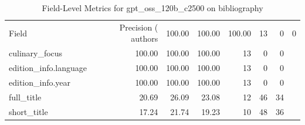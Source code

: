 \begin{table}
\caption{Field-Level Metrics for gpt_oss_120b_c2500 on bibliography}
\label{tab:fields_gpt_oss_120b_c2500_bibliography}
\begin{tabular}{lrrrrrr}
\toprule
Field & Precision (%
\midrule
authors & 100.00 & 100.00 & 100.00 & 13 & 0 & 0 \\
culinary_focus & 100.00 & 100.00 & 100.00 & 13 & 0 & 0 \\
edition_info.language & 100.00 & 100.00 & 100.00 & 13 & 0 & 0 \\
edition_info.year & 100.00 & 100.00 & 100.00 & 13 & 0 & 0 \\
full_title & 20.69 & 26.09 & 23.08 & 12 & 46 & 34 \\
short_title & 17.24 & 21.74 & 19.23 & 10 & 48 & 36 \\
\bottomrule
\end{tabular}
\end{table}
